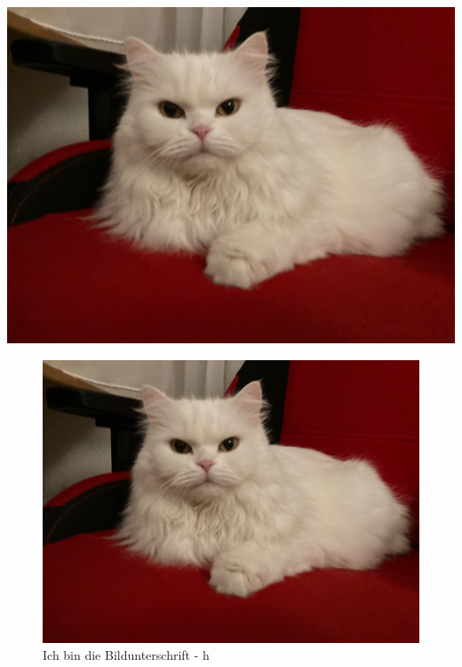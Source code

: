 \documentclass[12pt,ngerman,parskip=half]{scrartcl}
\begin{document}
\listoftables

\listoffigures

\blindtext[1]

\blindtext[1]

\includegraphics[width=\textwidth]{Bilder/Katze}

\blindtext[2]

\begin{figure}[h] %
\includegraphics[width=\textwidth]{Bilder/Katze}
\caption{Ich bin die Bildunterschrift - h}
\end{figure}
\end{document}
